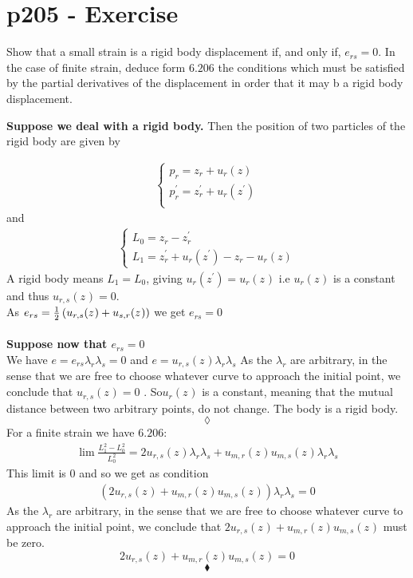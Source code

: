 \section{p205 - Exercise}
\begin{tcolorbox}
Show that a small strain is a rigid body displacement if, and only if, $e_{rs}=0$. In the case of finite strain, deduce form $\mathbf{6.206}$ the conditions which must be satisfied by the partial derivatives of the displacement in order that it may b a rigid body displacement.
\end{tcolorbox}
\textbf{Suppose we deal with  a rigid body.} Then the position of two particles of the rigid body are given by

\begin{align}
\left\{\begin{array}{l}
p_r=z_r+u_r(z)\\
p^{'}_r=z^{'}_r+u_r(z^{'})\\
\end{array}\right.
\end{align}
and
\begin{align}
\left\{\begin{array}{l}
L_0= z_r-z^{'}_r \\
L_1 = z^{'}_r+u_r(z^{'})-z_r-u_r(z)  
\end{array}\right.
\end{align}
A rigid body means $L_1=L_0$, giving $u_r(z^{'})=u_r(z^{})$ i.e $u_r(z^{})$ is a constant and thus $u_{r,s}(z^{})=0$.\\
As $e_{rs}=\frac{1}{2}\left(u_{r,s}(z^{})+u_{s,r}(z^{})\right)$ we get $e_{rs}=0$\\\\
\textbf{Suppose now that $e_{rs}=0$}\\
We have $e= e_{rs}\lambda_r\lambda_s = 0$ and $e= u_{r,s}(z^{})\lambda_r\lambda_s $
As the $\lambda_r$ are arbitrary, in the sense that we are free to choose whatever curve to approach the initial point, we conclude that $u_{r,s}(z^{})=0$ . So$u_{r}(z^{})$ is a constant, meaning that the mutual distance between two arbitrary points, do not change. The body is a rigid body.
 $$\lozenge$$
 For a finite strain we have $\mathbf{6.206}$:
 \begin{align}
 \lim \frac{L_1^2-L_0^2}{L_0^2}=2 u_{r,s}(z^{})\lambda_r\lambda_s + u_{m,r}(z^{})u_{m,s}(z^{})\lambda_r\lambda_s
 \end{align}
 This limit is $0$ and so we get as condition
  \begin{align}
 \left(2 u_{r,s}(z^{}) + u_{m,r}(z^{})u_{m,s}(z^{})\right)\lambda_r\lambda_s=0
 \end{align}
 As the $\lambda_r$ are arbitrary, in the sense that we are free to choose whatever curve to approach the initial point, we conclude that $2 u_{r,s}(z^{}) + u_{m,r}(z^{})u_{m,s}(z^{})$ must be zero.
 $$2 u_{r,s}(z^{}) + u_{m,r}(z^{})u_{m,s}(z^{})=0$$
 $$\blacklozenge$$
\newpage

